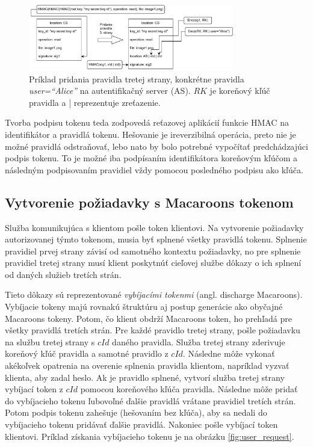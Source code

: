 \begin{figure}
    \centerline{\includegraphics[width=0.8\textwidth]{images/3rd_party_caveat}}
    \caption[Pridanie pravidla tretej strany]{Príklad pridania pravidla tretej strany, konkrétne pravidla \textit{user=``Alice''} na autentifikačný server (AS). $RK$ je koreňový kľúč pravidla a | reprezentuje zreťazenie.}
    \label{fig:add_caveat}
\end{figure}

Tvorba podpisu tokenu teda zodpovedá reťazovej aplikácií funkcie HMAC na identifikátor a pravidlá tokenu. Hešovanie je ireverzibilná operácia, preto nie je možné pravidlá odstraňovať, lebo nato by bolo potrebné vypočítať predchádzajúci podpis tokenu. To je možné iba podpísaním identifikátora koreňovým kľúčom a následným podpisovaním pravidiel vždy pomocou posledného podpisu ako kľúča.

\subsection{Vytvorenie požiadavky s Macaroons tokenom}

Služba komunikujúca s klientom pošle token klientovi. Na vytvorenie požiadavky autorizovanej týmto tokenom, musia byť splnené všetky pravidlá tokenu. Splnenie pravidiel prvej strany závisí od samotného kontextu požiadavky, no pre splnenie pravidiel tretej strany musí klient poskytnúť cieľovej službe dôkazy o ich splnení od daných služieb tretích strán.

Tieto dôkazy sú reprezentované \textit{vybíjacími tokenmi} (angl. discharge Macaroons). Vybíjacie tokeny majú rovnakú štruktúru aj postup generácie ako obyčajné Macaroons tokeny. Potom, čo klient obdrží Macaroons token, ho prehľadá pre všetky pravidlá tretích strán. Pre každé pravidlo tretej strany, pošle požiadavku na službu tretej strany s $cId$ daného pravidla. Služba tretej strany zderivuje koreňový kľúč pravidla a samotné pravidlo z $cId$. Následne môže vykonať akékoľvek opatrenia na overenie splnenia pravidla klientom, napríklad vyzvať klienta, aby zadal heslo. Ak je pravidlo splnené, vytvorí služba tretej strany vybíjací token z $cId$ pomocou koreňového kľúča pravidla. Následne môže pridať do vybíjacieho tokenu ľubovoľné ďalšie pravidlá vrátane pravidiel tretích strán. Potom podpis tokenu zahešuje (hešovaním bez kľúča), aby sa nedali do vybíjacieho tokenu pridávať ďalšie pravidlá. Nakoniec pošle vybíjací token klientovi. Príklad získania vybíjacieho tokenu je na obrázku \ref{fig:user_request}.


